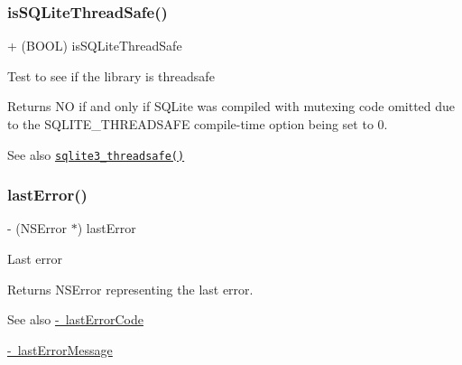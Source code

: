 \subsubsection{\texorpdfstring{is\+S\+Q\+Lite\+Thread\+Safe()}{isSQLiteThreadSafe()}}
{\footnotesize\ttfamily + (B\+O\+OL) is\+S\+Q\+Lite\+Thread\+Safe \begin{DoxyParamCaption}{ }\end{DoxyParamCaption}}

Test to see if the library is threadsafe

\begin{DoxyReturn}{Returns}
{\ttfamily NO} if and only if S\+Q\+Lite was compiled with mutexing code omitted due to the S\+Q\+L\+I\+T\+E\+\_\+\+T\+H\+R\+E\+A\+D\+S\+A\+FE compile-\/time option being set to 0.
\end{DoxyReturn}
\begin{DoxySeeAlso}{See also}
\href{http://sqlite.org/c3ref/threadsafe.html}{\tt sqlite3\+\_\+threadsafe()} 
\end{DoxySeeAlso}
\mbox{\label{interface_o_p_t_l_y_f_m_d_b_database_a477a6ff4d9daaac53a56c0a058a0d2f7}} 
\subsubsection{\texorpdfstring{last\+Error()}{lastError()}}
{\footnotesize\ttfamily -\/ (N\+S\+Error $\ast$) last\+Error \begin{DoxyParamCaption}{ }\end{DoxyParamCaption}}

Last error

\begin{DoxyReturn}{Returns}
{\ttfamily N\+S\+Error} representing the last error.
\end{DoxyReturn}
\begin{DoxySeeAlso}{See also}
\mbox{\hyperlink{interface_o_p_t_l_y_f_m_d_b_database_a9f15cf87d3c764783ce0c6beb39393a9}{-\/ last\+Error\+Code}} 

\mbox{\hyperlink{interface_o_p_t_l_y_f_m_d_b_database_a082c5d58576df07956308656064e1f63}{-\/ last\+Error\+Message}} 
\end{DoxySeeAlso}
\mbox{\label{interface_o_p_t_l_y_f_m_d_b_database_a9f15cf87d3c764783ce0c6beb39393a9}} 
